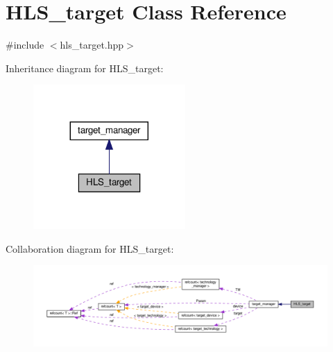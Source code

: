 \hypertarget{classHLS__target}{}\section{H\+L\+S\+\_\+target Class Reference}
\label{classHLS__target}


{\ttfamily \#include $<$hls\+\_\+target.\+hpp$>$}



Inheritance diagram for H\+L\+S\+\_\+target\+:
\nopagebreak
\begin{figure}[H]
\begin{center}
\leavevmode
\includegraphics[width=164pt]{d6/df0/classHLS__target__inherit__graph}
\end{center}
\end{figure}


Collaboration diagram for H\+L\+S\+\_\+target\+:
\nopagebreak
\begin{figure}[H]
\begin{center}
\leavevmode
\includegraphics[width=350pt]{d1/d26/classHLS__target__coll__graph}
\end{center}
\end{figure}
